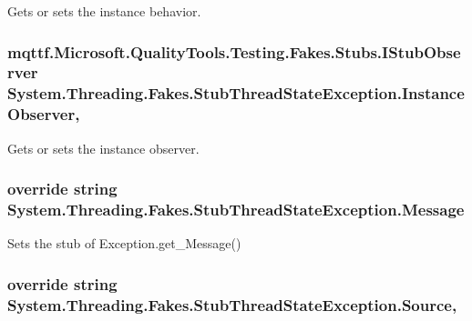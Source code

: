 Gets or sets the instance behavior.

\hypertarget{class_system_1_1_threading_1_1_fakes_1_1_stub_thread_state_exception_a449622bdb3b3ee906650b5b830ad58f4}{
\subsubsection[{Instance\-Observer}]{\setlength{\rightskip}{0pt plus 5cm}mqttf.\-Microsoft.\-Quality\-Tools.\-Testing.\-Fakes.\-Stubs.\-I\-Stub\-Observer System.\-Threading.\-Fakes.\-Stub\-Thread\-State\-Exception.\-Instance\-Observer\hspace{0.3cm}{\ttfamily [get]}, {\ttfamily [set]}}}\label{class_system_1_1_threading_1_1_fakes_1_1_stub_thread_state_exception_a449622bdb3b3ee906650b5b830ad58f4}


Gets or sets the instance observer.

\hypertarget{class_system_1_1_threading_1_1_fakes_1_1_stub_thread_state_exception_a6b0d8fe0dac6adc5e46cff71989791d0}{
\subsubsection[{Message}]{\setlength{\rightskip}{0pt plus 5cm}override string System.\-Threading.\-Fakes.\-Stub\-Thread\-State\-Exception.\-Message\hspace{0.3cm}{\ttfamily [get]}}}\label{class_system_1_1_threading_1_1_fakes_1_1_stub_thread_state_exception_a6b0d8fe0dac6adc5e46cff71989791d0}


Sets the stub of Exception.\-get\-\_\-\-Message()

\hypertarget{class_system_1_1_threading_1_1_fakes_1_1_stub_thread_state_exception_a54013b74412bd619f2540b4bba75f523}{
\subsubsection[{Source}]{\setlength{\rightskip}{0pt plus 5cm}override string System.\-Threading.\-Fakes.\-Stub\-Thread\-State\-Exception.\-Source\hspace{0.3cm}{\ttfamily [get]}, {\ttfamily [set]}}}\label{class_system_1_1_threading_1_1_fakes_1_1_stub_thread_state_exception_a54013b74412bd619f2540b4bba75f523}



